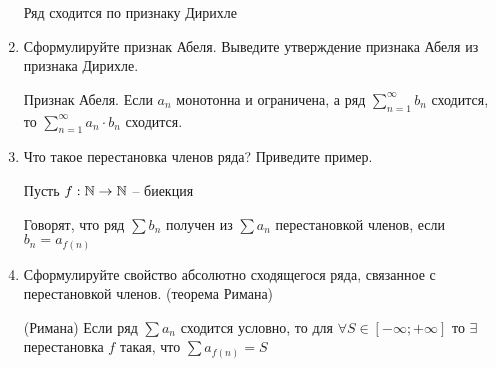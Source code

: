 \documentclass[a4paper]{article}
\begin{document}
\begin{enumerate}
\begin{example}
            Ряд сходится по признаку Дирихле
        \end{example}

        \item Сформулируйте признак Абеля. Выведите утверждение признака Абеля из признака Дирихле.
        
        \begin{theorem}
            Признак Абеля. Если $a_n$ монотонна и ограничена, а ряд $\sum_{n=1}^{\infty}b_n$ сходится,
            то $\sum_{n=1}^{\infty}a_n \cdot b_n$ сходится.
        \end{theorem}
        

        \item Что такое перестановка членов ряда? Приведите пример.
        
        Пусть $f: \mathbb{N} \to \mathbb{N}$ -- биекция

        Говорят, что ряд $\sum b_n$ получен из $\sum a_n$ перестановкой членов, если $b_n = a_{f(n)}$

        \item Сформулируйте свойство абсолютно сходящегося ряда, связанное с перестановкой членов. (теорема Римана)
        
        \begin{theorem}
            (Римана) Если ряд $\sum a_n$ сходится условно, то для $\forall S \in [-\infty; +\infty]$ то $\exists$ перестановка $f$ такая, что $\sum a_{f(n)} = S$
        \end{theorem}
    \end{enumerate}
\end{document}
